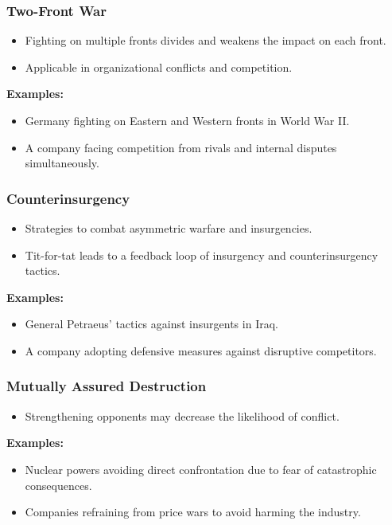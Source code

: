 \begin{frame}[fragile]\frametitle{Two-Front War}
\begin{itemize}
    \item Fighting on multiple fronts divides and weakens the impact on each front.
    \item Applicable in organizational conflicts and competition.
\end{itemize}
\textbf{Examples:}
\begin{itemize}
    \item Germany fighting on Eastern and Western fronts in World War II.
    \item A company facing competition from rivals and internal disputes simultaneously.
\end{itemize}
\end{frame}

\begin{frame}[fragile]\frametitle{Counterinsurgency}
\begin{itemize}
    \item Strategies to combat asymmetric warfare and insurgencies.
    \item Tit-for-tat leads to a feedback loop of insurgency and counterinsurgency tactics.
\end{itemize}
\textbf{Examples:}
\begin{itemize}
    \item General Petraeus' tactics against insurgents in Iraq.
    \item A company adopting defensive measures against disruptive competitors.
\end{itemize}
\end{frame}

\begin{frame}[fragile]\frametitle{Mutually Assured Destruction}
\begin{itemize}
    \item Strengthening opponents may decrease the likelihood of conflict.
\end{itemize}
\textbf{Examples:}
\begin{itemize}
    \item Nuclear powers avoiding direct confrontation due to fear of catastrophic consequences.
    \item Companies refraining from price wars to avoid harming the industry.
\end{itemize}
\end{frame}

